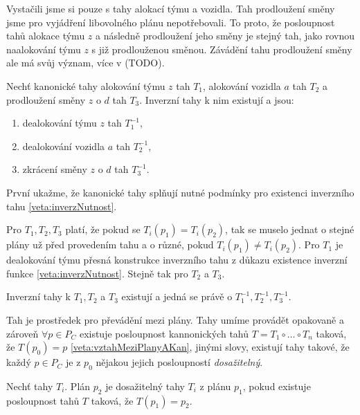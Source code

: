 Vystačili jsme si pouze s tahy alokací týmu a vozidla.
Tah prodloužení směny jsme pro vyjádření libovolného plánu nepotřebovali.
To proto, že posloupnost tahů alokace týmu $z$ a následně prodloužení jeho směny je stejný tah, jako rovnou naalokování týmu $z$ s již prodlouženou směnou.
Závádění tahu prodloužení směny ale má svůj význam, více v (TODO).

\begin{veta}
  Nechť kanonické tahy alokování týmu $z$ tah $T_1$, alokování vozidla $a$ tah $T_2$ a prodloužení směny $z$ o $d$ tah $T_3$.
  Inverzní tahy k nim existují a jsou:

  \begin{enumerate}
    \item
      dealokování týmu $z$ tah $T_1^{-1}$,

    \item
      dealokování vozidla $a$ tah $T_2^{-1}$,

    \item
      zkrácení směny $z$ o $d$ tah $T_3^{-1}$.
  \end{enumerate}
\end{veta}
\begin{dukaz}
  První ukažme, že kanonické tahy splňují nutné podmínky pro existenci inverzního tahu \ref{veta:inverzNutnost}.

  Pro $T_1, T_2, T_3$ platí, že pokud se $T_i(p_1) = T_i(p_2)$, tak se muselo jednat o stejné plány už před provedením tahu a o různé, pokud $T_i(p_1) \neq T_i(p_2)$.
  Pro $T_1$ je dealokování týmu přesná konstrukce inverzního tahu z důkazu existence inverzní funkce \ref{veta:inverzNutnost}.
  Stejně tak pro $T_2$ a $T_3$.

  Inverzní tahy k $T_1, T_2$ a $T_3$ existují a jedná se právě o $T_1^{-1}, T_2^{-1}, T_3^{-1}$.
\end{dukaz}

Tah je prostředek pro převádění mezi plány.
Tahy umíme provádět opakovaně a zároveň $\forall p \in P_C$ existuje posloupnost kannonických tahů $T = T_1 \circ \dots \circ T_n$ taková, že $T(p_0) = p$ \ref{veta:vztahMeziPlanyAKan},
jinými slovy, existují tahy takové, že každý $p \in P_C$ je z $p_0$ nějakou jejich posloupností \textit{dosažitelný}.

\begin{definice}
  Nechť tahy $T_i$.
  Plán $p_2$ je dosažitelný tahy $T_i$ z plánu $p_1$, pokud existuje posloupnost tahů $T$ taková, že $T(p_1) = p_2$.
\end{definice}

